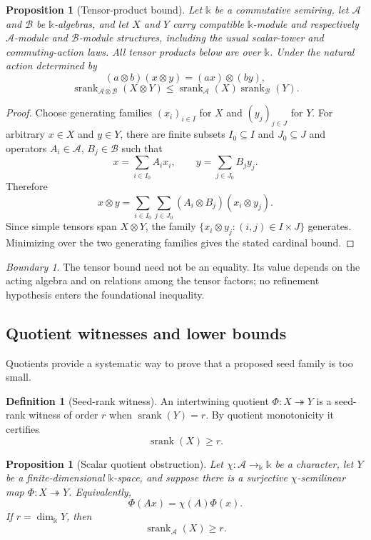 \documentclass[11pt]{article}
\newtheorem{proposition}[theorem]{Proposition}
\theoremstyle{definition}
\newtheorem{definition}[theorem]{Definition}
\theoremstyle{remark}
\newtheorem{boundary}[theorem]{Boundary}
\newcommand{\cA}{\mathcal A}
\newcommand{\cB}{\mathcal B}
\newcommand{\srank}{\operatorname{srank}}
\newcommand{\bbk}{\mathbb{k}}
\begin{document}
\begin{proposition}[Tensor-product bound]
\label{prop:tensor-product-bound}
Let $\bbk$ be a commutative semiring, let $\cA$ and $\cB$ be $\bbk$-algebras, and let $X$ and $Y$ carry compatible $\bbk$-module and respectively $\cA$-module and $\cB$-module structures, including the usual scalar-tower and commuting-action laws. All tensor products below are over $\bbk$. Under the natural action determined by
\[
(a\otimes b)(x\otimes y)=(ax)\otimes(by),
\]
\[
\boxed{
\srank_{\cA\otimes\cB}(X\otimes Y)
\le
\srank_{\cA}(X)\srank_{\cB}(Y).
}
\]
\end{proposition}

\begin{proof}
Choose generating families $(x_i)_{i\in I}$ for $X$ and $(y_j)_{j\in J}$ for $Y$. For arbitrary $x\in X$ and $y\in Y$, there are finite subsets $I_0\subseteq I$ and $J_0\subseteq J$ and operators $A_i\in\cA$, $B_j\in\cB$ such that
\[
x=\sum_{i\in I_0}A_ix_i,
\qquad
y=\sum_{j\in J_0}B_jy_j.
\]
Therefore
\[
x\otimes y
=
\sum_{i\in I_0}\sum_{j\in J_0}
(A_i\otimes B_j)(x_i\otimes y_j).
\]
Since simple tensors span $X\otimes Y$, the family $\{x_i\otimes y_j:(i,j)\in I\times J\}$ generates. Minimizing over the two generating families gives the stated cardinal bound.
\end{proof}

\begin{boundary}
The tensor bound need not be an equality. Its value depends on the acting algebra and on relations among the tensor factors; no refinement hypothesis enters the foundational inequality.
\end{boundary}

\subsection{Quotient witnesses and lower bounds}

Quotients provide a systematic way to prove that a proposed seed family is too small.

\begin{definition}[Seed-rank witness]
An intertwining quotient $\Phi:X\twoheadrightarrow Y$ is a seed-rank witness of order $r$ when $\srank(Y)=r$. By quotient monotonicity it certifies
\[
\srank(X)\ge r.
\]
\end{definition}

\begin{proposition}[Scalar quotient obstruction]
\label{prop:scalar-quotient-obstruction}
Let $\chi:\cA\to_{\bbk}\bbk$ be a character, let $Y$ be a finite-dimensional $\bbk$-space, and suppose there is a surjective $\chi$-semilinear map $\Phi:X\twoheadrightarrow Y$. Equivalently,
\[
\Phi(Ax)=\chi(A)\Phi(x).
\]
If $r=\dim_{\bbk}Y$, then
\[
\boxed{\srank_{\cA}(X)\ge r.}
\]
\end{proposition}
\end{document}
